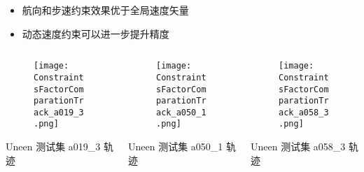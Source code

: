 \begin{frame}
\begin{columns}[t]
\begin{column}{0.5\textwidth}
		\vspace{-0.5cm}
		{
		   	\small
			\begin{itemize}
				\item 航向和步速约束效果优于全局速度矢量
				\item 动态速度约束可以进一步提升精度
			\end{itemize}
		 }
		\end{column}    
	\end{columns}
	\begin{columns}[t]
		\begin{column}{0.3\textwidth}
		   	\begin{figure}
    			\texttt{[image: ConstraintsFactorComparationTrack\_a019\_3.png]}
		   	\end{figure}
		   	\vspace{-0.5cm}
		   	\hspace{1.2cm} {\tiny Uneen 测试集 a019\_3 轨迹}
		\end{column}   
		\begin{column}{0.3\textwidth}
		   	\begin{figure}
    			\texttt{[image: ConstraintsFactorComparationTrack\_a050\_1.png]}
		   	\end{figure}
		   	\vspace{-0.5cm}
		   	\hspace{1.2cm} {\tiny Uneen 测试集 a050\_1 轨迹}
		\end{column}  
		\begin{column}{0.3\textwidth}
		   	\begin{figure}
    			\texttt{[image: ConstraintsFactorComparationTrack\_a058\_3.png]}
		   	\end{figure}
		   	\vspace{-0.5cm}
		   	\hspace{1.2cm} {\tiny Uneen 测试集 a058\_3 轨迹}
		\end{column}
	\end{columns} 	
\end{frame}

